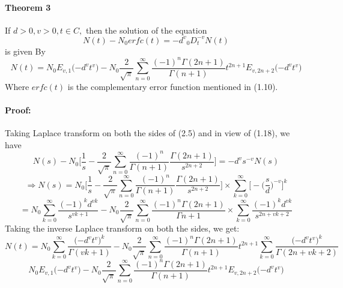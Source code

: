 \documentclass{article}
\begin{document}
\paragraph{Theorem 3}
If $d > 0, v > 0, t \in C,$ then the solution of the equation
\begin{equation}
    N(t) - N_0erfc(t) = {-d^v}{_0D_t^{-v}}N(t)
\end{equation}
is given By
\begin{equation}
    N(t) = N_0E_{v,1}
    \Big({-d^v}{t^v}\Big)
    -{N_0}\frac{2}{\sqrt{\pi}}
    \sum_{n = 0}^{\infty}
    \frac{{(-1)^n}\Gamma{(2n+1)}}{\Gamma{(n+1)}}
    t^{2n+1}
    E_{v,2n+2}
    \Big({-d^v}{t^v}\Big)
\end{equation}
Where $erfc(t)$ is the complementary error function mentioned in (1.10).
\paragraph{Proof:}
Taking Laplace transform on both the sides of (2.5) and in view of (1.18), we have
\begin{equation*}
    N(s) - N_0
    \bigg[
        \frac{1}{s}
        -\frac{2}{\sqrt{\pi}}
        \sum_{n = 0}^{\infty}
        \frac{{(-1)^n}}{\Gamma{(n+1)}}
        \frac{\Gamma{(2n+1)}}{s^{2n+2}}
    \bigg]
    ={-d^v}{s^{-v}}N(s)
\end{equation*}
\begin{equation*}
    \Rightarrow N(s) = N_0
    \bigg[
        \frac{1}{s}
        -\frac{2}{\sqrt{\pi}}
        \sum_{n = 0}^{\infty}
        \frac{{(-1)^n}}{\Gamma{(n+1)}}
        \frac{\Gamma{(2n+1)}}{s^{2n+2}}
    \bigg]
    \times \sum_{k = 0}^{\infty}
    \bigg[
        -{\bigg(\frac{s}{d}\bigg)^{-v}}
    \bigg]^k
\end{equation*}
\begin{equation*}
    =N_0
    \sum_{k = 0}^{\infty}
    \frac{{(-1)^k}{d^{vk}}}{s^{vk+1}}
    -N_0\frac{2}{\sqrt{\pi}}
    \sum_{n = 0}^{\infty}
    \frac{(-1)^n \Gamma{(2n+1)}}{\Gamma{n+1}}
    \times \sum_{k = 0}^{\infty}
    \frac{(-1)^k {d^{vk}}}{s^{2n+vk+2}}
\end{equation*}
Taking the inverse Laplace transform on both the sides, we get:
\begin{equation*}
    N(t) = N_0
    \sum_{k = 0}^{\infty}
    \frac{\big({-d^v}{t^v}\big)^k}{\Gamma{(vk+1)}}
    -{N_0}\frac{2}{\sqrt{\pi}}
    \sum_{n = 0}^{\infty}
    \frac{{(-1)^n}\Gamma{(2n+1)}}{\Gamma{(n+1)}}
    t^{2n+1}
    \sum_{k = 0}^{\infty}
    \frac{\big({-d^v}{t^v}\big)^k}{\Gamma{(2n+{vk}+2)}}
\end{equation*}
\begin{equation*}
    N_0E_{v,1}
    \big({-d^v}{t^v}\big)
    -N_0\frac{2}{\sqrt{\pi}}
    \sum_{n = 0}^{\infty}
    \frac{(-1)^n \Gamma{(2n+1)}}{\Gamma{(n+1)}}
    t^{2n+1} E_{v, 2n+2}
    \big({-d^v}{t^v}\big)
\end{equation*}
\end{document}
